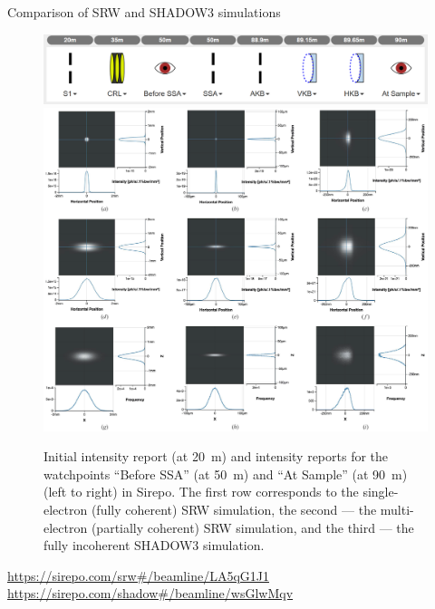 \documentclass[final]{beamer}
\newlength{\twocolwid}
\newcommand{\colorify}[1]{\textcolor{linkcolor}{#1}}
\newcommand{\mylink}[1]{\href{#1}{\colorify{#1}}}
\begin{document}
\begin{frame}[t]
\begin{columns}[t]
\begin{column}{\twocolwid}
\begin{block}{\faSpinner{} Comparison of SRW and SHADOW3 simulations}
\begin{figure}
\includegraphics[width=0.6\linewidth]{images/imaginary_beamline.png} \\
\vspace{1cm}
\includegraphics[width=0.8\linewidth]{images/srw-shadow_comparison.png}
\caption{Initial intensity report (at 20~m) and intensity reports for the
watchpoints ``Before SSA'' (at 50~m) and ``At Sample'' (at 90~m) (left to right)
in Sirepo. The first row corresponds to the single-electron (fully coherent) SRW
simulation, the second --- the multi-electron (partially coherent) SRW
simulation, and the third --- the fully incoherent SHADOW3 simulation.}
\end{figure}

\vspace{-0.8cm}

\begin{center}
\mylink{https://sirepo.com/srw\#/beamline/LA5qG1J1}~~~~~~
\mylink{https://sirepo.com/shadow\#/beamline/wsGlwMqv}
\end{center}

\end{block}

\end{column} %





\end{columns}
\end{frame}
\end{document}
